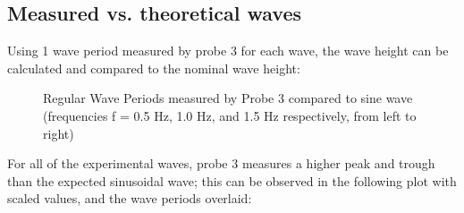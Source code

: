 \documentclass{article}
\begin{document}
	\subsection{Measured vs. theoretical waves}
	Using 1 wave period measured by probe 3 for each wave, the wave height can be calculated and compared to the nominal wave height: 
	\begin{figure}[H]
		\centering
		\caption{Regular Wave Periods measured by Probe 3 compared to sine wave (frequencies f = 0.5 Hz, 1.0 Hz, and 1.5 Hz respectively, from left to right)}
		\label{individualperiods}
	\end{figure}
	For all of the experimental waves, probe 3 measures a higher peak and trough than the expected sinusoidal wave; this can be observed in the following plot with scaled values, and the wave periods overlaid:\\
\end{document}
